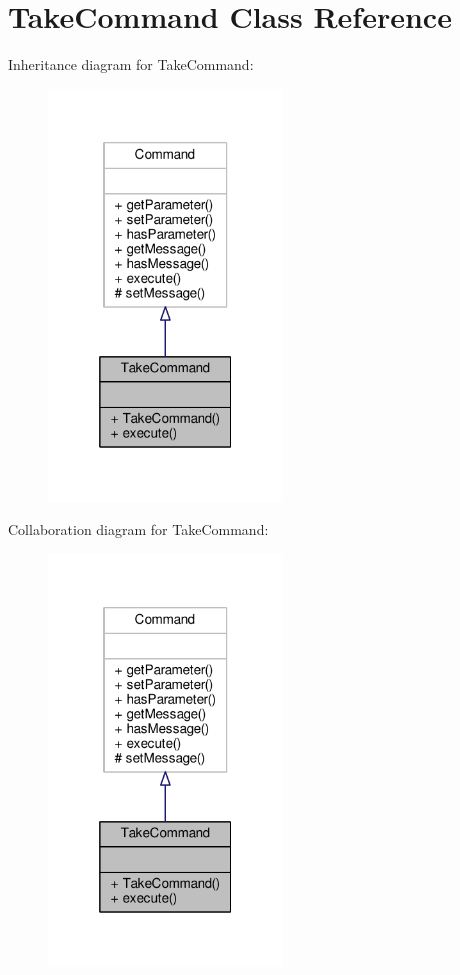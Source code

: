 \hypertarget{classTakeCommand}{\section{Take\-Command Class Reference}
\label{classTakeCommand}
}


Inheritance diagram for Take\-Command\-:
\nopagebreak
\begin{figure}[H]
\begin{center}
\leavevmode
\includegraphics[width=176pt]{classTakeCommand__inherit__graph}
\end{center}
\end{figure}


Collaboration diagram for Take\-Command\-:
\nopagebreak
\begin{figure}[H]
\begin{center}
\leavevmode
\includegraphics[width=176pt]{classTakeCommand__coll__graph}
\end{center}
\end{figure}
